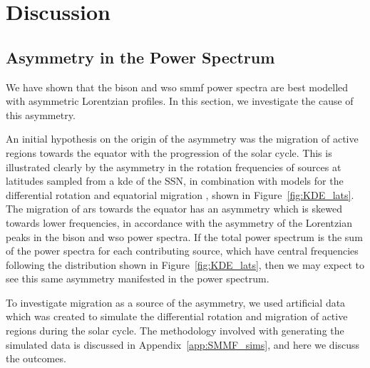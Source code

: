 \section{Discussion}\label{sec:SMMF_artificial}


\subsection{Asymmetry in the Power Spectrum}
\label{sec:asymmetry}

We have shown that the \gls{bison} and \gls{wso} \gls{smmf} power spectra are best modelled with asymmetric Lorentzian profiles. In this section, we investigate the cause of this asymmetry. 

An initial hypothesis on the origin of the asymmetry was the migration of active regions towards the equator with the progression of the solar cycle. This is illustrated clearly by the asymmetry in the rotation frequencies of sources at latitudes sampled from a \gls{kde} of the SSN, in combination with models for the differential rotation \citep{snodgrass_magnetic_1983} and equatorial migration \citep{li_latitude_2001}, shown in Figure~\ref{fig:KDE_lats}. The migration of \glspl{ar} towards the equator has an asymmetry which is skewed towards lower frequencies, in accordance with the asymmetry of the Lorentzian peaks in the \gls{bison} and \gls{wso} power spectra. If the total power spectrum is the sum of the power spectra for each contributing source, which have central frequencies following the distribution shown in Figure~\ref{fig:KDE_lats}, then we may expect to see this same asymmetry manifested in the power spectrum.

To investigate migration as a source of the asymmetry, we used artificial data which was created to simulate the differential rotation and migration of active regions during the solar cycle. The methodology involved with generating the simulated data is discussed in Appendix~\ref{app:SMMF_sims}, and here we discuss the outcomes.

